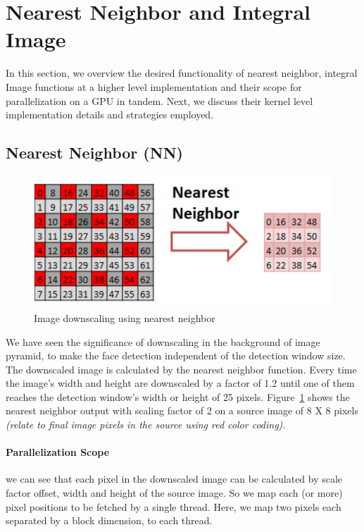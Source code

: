 \section{Nearest Neighbor and Integral Image}\label{sec:nnii}


In this section, we overview the desired functionality of nearest neighbor, 
integral Image functions at a higher level implementation and their scope 
for parallelization on a GPU in tandem. Next, we discuss their kernel 
level implementation details and strategies employed.

\subsection{Nearest Neighbor (NN)}\label{sec:nn}
\begin{figure}[h]
  \centering
  \includegraphics[width=0.9\linewidth]{figs/nn_img_crop.pdf}
  \caption{Image downscaling using nearest neighbor}
  \label{fig:NN}
\end{figure}


We have seen the significance of downscaling in the background of image 
pyramid, to make the face detection independent of the detection window size.  
The downscaled image is calculated by the nearest neighbor function. 
Every time the image’s width and height are downscaled by a factor 
of 1.2 until one of them reaches the detection window’s width or height of 25 pixels. 
Figure~\ref{fig:NN} shows the nearest neighbor output  with 
scaling factor of  2 on a source image of 8 X 8 pixels
\textit{(relate to final image pixels in the source using red color coding)}.

\paragraph{Parallelization Scope}
we can see that each pixel in the downscaled image can be calculated 
by scale factor offset,  width and  height of the source image. 
So we map each (or more) pixel positions to be fetched 
by a single thread. Here, we map two pixels each separated 
by a block dimension, to each thread.


